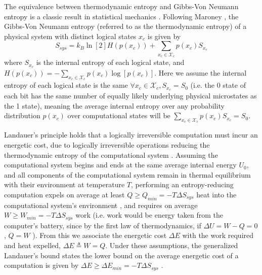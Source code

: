 \documentclass[12pt,onecolumn, margin=1in]{IEEEtran}
\begin{document}
The equivalence between thermodynamic entropy and Gibbs-Von Neumann entropy is a classic result in statistical mechanics \cite{tolman, gibbs, maroney2008physicalbasisgibbsvonneumann}. Following Maroney \cite[p. 13]{Maroney}, the Gibbs-Von Neumann entropy (referred to as the thermodynamic entropy) of a physical system with distinct logical states $x_c$ is given by
\begin{equation}
    \label{eq:phys_ent}
    S_{sys} = k_B \ln[2]H(p(x_c)) + \sum_{x_c \in \mathcal{X}_c} p(x_c) S_{x_c}
\end{equation}
where $S_{x_c}$ is the internal entropy of each logical state, and $H(p(x_c)) = -\sum_{x_c \in \mathcal{X}_c} p(x_c) \log[p(x_c)]$. Here we assume the internal entropy of each logical state is the same $\forall x_c \in \mathcal{X}_c, S_{x_c} = S_0$ (i.e. the 0 state of each bit has the same number of equally likely underlying physical microstates as the 1 state), meaning the average internal entropy over any probability distribution $p(x_c)$ over computational states will be $\sum_{x_c \in \mathcal{X}_c} p(x_c) S_{x_c} = S_0$. 

Landauer's principle holds that a logically irreversible computation must incur an energetic cost, due to logically irreversible operations reducing the thermodynamic entropy of the computational system \cite{Landauer1961}. Assuming the computational system begins and ends at the same average internal energy $U_0$, and all components of the computational system remain in thermal equilibrium with their environment at temperature $T$, performing an entropy-reducing computation expels on average at least $Q \geq Q_{min} = -T \Delta S_{sys}$ heat into the computational system's environment \cite{Landauer1961, Maroney}, and requires on average $W \geq W_{min} = -T \Delta S_{sys}$ work (i.e. work would be energy taken from the computer's battery, since by the first law of thermodynamics, if $\Delta U = W - Q = 0$, $Q = W$ \cite{Callen}). From this we associate the energetic cost $\Delta E$ with the work required and heat expelled, $\Delta E \triangleq W = Q$. Under these assumptions, the generalized Landauer's bound states the lower bound on the average energetic cost of a computation is given by $\Delta E \geq \Delta E_{min} = -T \Delta S_{sys}$ \cite{Landauer1961, Maroney}.
\end{document}
